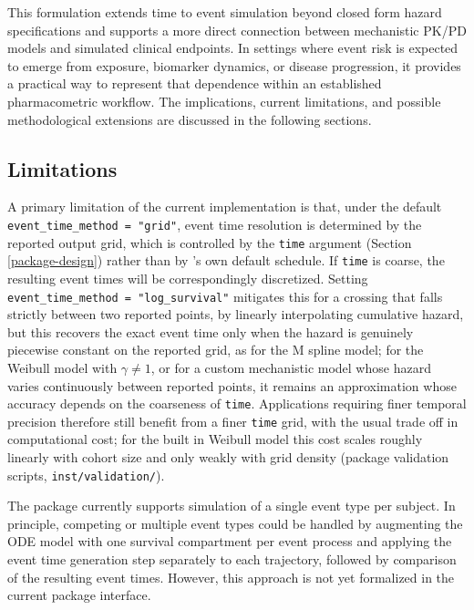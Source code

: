 This formulation extends time to event simulation beyond closed form hazard specifications and supports a more direct connection between mechanistic PK/PD models and simulated clinical endpoints. In settings where event risk is expected to emerge from exposure, biomarker dynamics, or disease progression, it provides a practical way to represent that dependence within an established pharmacometric workflow. The implications, current limitations, and possible methodological extensions are discussed in the following sections.

\subsection{Limitations}\label{limitations}

A primary limitation of the current implementation is that, under the default \texttt{event\_time\_method\ =\ "grid"}, event time resolution is determined by the reported output grid, which is controlled by the \texttt{time} argument (Section \ref{package-design}) rather than by 's own default schedule. If \texttt{time} is coarse, the resulting event times will be correspondingly discretized. Setting \texttt{event\_time\_method\ =\ "log\_survival"} mitigates this for a crossing that falls strictly between two reported points, by linearly interpolating cumulative hazard, but this recovers the exact event time only when the hazard is genuinely piecewise constant on the reported grid, as for the M spline model; for the Weibull model with \(\gamma \neq 1\), or for a custom mechanistic model whose hazard varies continuously between reported points, it remains an approximation whose accuracy depends on the coarseness of \texttt{time}. Applications requiring finer temporal precision therefore still benefit from a finer \texttt{time} grid, with the usual trade off in computational cost; for the built in Weibull model this cost scales roughly linearly with cohort size and only weakly with grid density (package validation scripts, \texttt{inst/validation/}).

The package currently supports simulation of a single event type per subject. In principle, competing or multiple event types could be handled by augmenting the ODE model with one survival compartment per event process and applying the event time generation step separately to each trajectory, followed by comparison of the resulting event times. However, this approach is not yet formalized in the current package interface.

